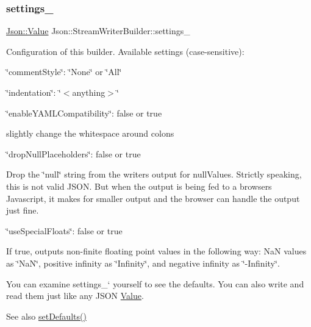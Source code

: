 \subsubsection{\texorpdfstring{settings\+\_\+}{settings\_}}
{\footnotesize\ttfamily \hyperlink{class_json_1_1_value}{Json\+::\+Value} Json\+::\+Stream\+Writer\+Builder\+::settings\+\_\+}

Configuration of this builder. Available settings (case-\/sensitive)\+:
\begin{DoxyItemize}
\item \char`\"{}comment\+Style\char`\"{}\+: \char`\"{}\+None\char`\"{} or \char`\"{}\+All\char`\"{}
\item \char`\"{}indentation\char`\"{}\+: \char`\"{}$<$anything$>$\char`\"{}
\item \char`\"{}enable\+Y\+A\+M\+L\+Compatibility\char`\"{}\+: false or true
\begin{DoxyItemize}
\item slightly change the whitespace around colons
\end{DoxyItemize}
\item \char`\"{}drop\+Null\+Placeholders\char`\"{}\+: false or true
\begin{DoxyItemize}
\item Drop the \char`\"{}null\char`\"{} string from the writer\textquotesingle{}s output for null\+Values. Strictly speaking, this is not valid J\+S\+ON. But when the output is being fed to a browser\textquotesingle{}s Javascript, it makes for smaller output and the browser can handle the output just fine.
\end{DoxyItemize}
\item \char`\"{}use\+Special\+Floats\char`\"{}\+: false or true
\begin{DoxyItemize}
\item If true, outputs non-\/finite floating point values in the following way\+: NaN values as \char`\"{}\+Na\+N\char`\"{}, positive infinity as \char`\"{}\+Infinity\char`\"{}, and negative infinity as \char`\"{}-\/\+Infinity\char`\"{}.
\end{DoxyItemize}
\end{DoxyItemize}

You can examine \textquotesingle{}settings\+\_\+` yourself to see the defaults. You can also write and read them just like any J\+S\+ON \hyperlink{class_json_1_1_value}{Value}. \begin{DoxySeeAlso}{See also}
\hyperlink{class_json_1_1_stream_writer_builder_a53bf106b141e28637b01ad0ecd2acbf6}{set\+Defaults()} 
\end{DoxySeeAlso}


